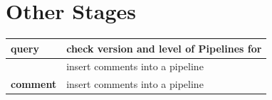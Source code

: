 \chapter{Other Stages}
\begin{tabularx}{\textwidth}{>{\bfseries}lX}
\toprule
query&check version and level of Pipelines for \nr{}
\\\midrule
\doublehyphenunquoted{}&insert comments into a pipeline
\\\midrule
comment&insert comments into a pipeline
\\\bottomrule
\end{tabularx}








